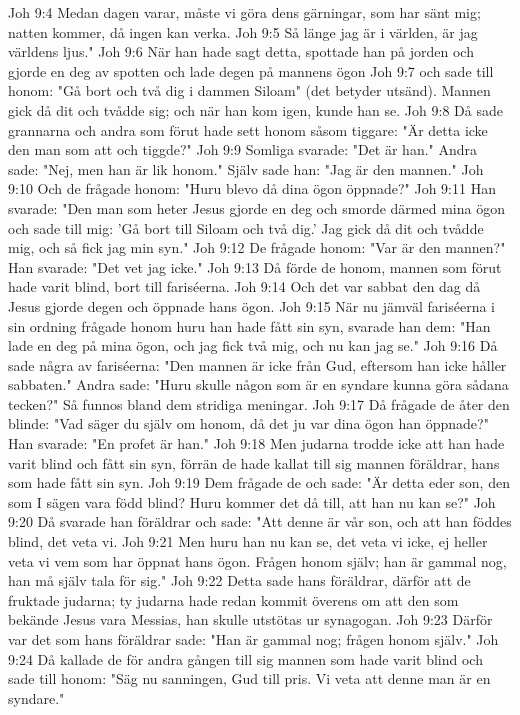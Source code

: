 Joh 9:4  Medan dagen varar, måste vi göra dens gärningar, som har sänt mig; natten kommer, då ingen kan verka.
Joh 9:5  Så länge jag är i världen, är jag världens ljus."
Joh 9:6  När han hade sagt detta, spottade han på jorden och gjorde en deg av spotten och lade degen på mannens ögon
Joh 9:7  och sade till honom: "Gå bort och två dig i dammen Siloam" (det betyder utsänd). Mannen gick då dit och tvådde sig; och när han kom igen, kunde han se.
Joh 9:8  Då sade grannarna och andra som förut hade sett honom såsom tiggare: "Är detta icke den man som att och tiggde?"
Joh 9:9  Somliga svarade: "Det är han." Andra sade: "Nej, men han är lik honom." Själv sade han: "Jag är den mannen."
Joh 9:10  Och de frågade honom: "Huru blevo då dina ögon öppnade?"
Joh 9:11  Han svarade: "Den man som heter Jesus gjorde en deg och smorde därmed mina ögon och sade till mig: 'Gå bort till Siloam och två dig.' Jag gick då dit och tvådde mig, och så fick jag min syn."
Joh 9:12  De frågade honom: "Var är den mannen?" Han svarade: "Det vet jag icke."
Joh 9:13  Då förde de honom, mannen som förut hade varit blind, bort till fariséerna.
Joh 9:14  Och det var sabbat den dag då Jesus gjorde degen och öppnade hans ögon.
Joh 9:15  När nu jämväl fariséerna i sin ordning frågade honom huru han hade fått sin syn, svarade han dem: "Han lade en deg på mina ögon, och jag fick två mig, och nu kan jag se."
Joh 9:16  Då sade några av fariséerna: "Den mannen är icke från Gud, eftersom han icke håller sabbaten." Andra sade: "Huru skulle någon som är en syndare kunna göra sådana tecken?" Så funnos bland dem stridiga meningar.
Joh 9:17  Då frågade de åter den blinde: "Vad säger du själv om honom, då det ju var dina ögon han öppnade?" Han svarade: "En profet är han."
Joh 9:18  Men judarna trodde icke att han hade varit blind och fått sin syn, förrän de hade kallat till sig mannen föräldrar, hans som hade fått sin syn.
Joh 9:19  Dem frågade de och sade: "Är detta eder son, den som I sägen vara född blind? Huru kommer det då till, att han nu kan se?"
Joh 9:20  Då svarade han föräldrar och sade: "Att denne är vår son, och att han föddes blind, det veta vi.
Joh 9:21  Men huru han nu kan se, det veta vi icke, ej heller veta vi vem som har öppnat hans ögon. Frågen honom själv; han är gammal nog, han må själv tala för sig."
Joh 9:22  Detta sade hans föräldrar, därför att de fruktade judarna; ty judarna hade redan kommit överens om att den som bekände Jesus vara Messias, han skulle utstötas ur synagogan.
Joh 9:23  Därför var det som hans föräldrar sade: "Han är gammal nog; frågen honom själv."
Joh 9:24  Då kallade de för andra gången till sig mannen som hade varit blind och sade till honom: "Säg nu sanningen, Gud till pris. Vi veta att denne man är en syndare."
